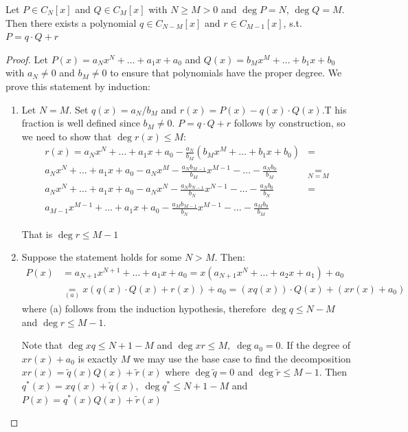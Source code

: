 \begin{lemma} \label{lm:long div}
    Let $P \in C_N[x]$ and $Q \in C_M[x]$ with $N \geq M > 0$ and $\deg P = N$, $\deg Q = M$. Then there exists a polynomial $q \in C_{N-M}[x]$ and $r \in C_{M-1}[x]$, s.t. $P = q\cdot Q + r$
\end{lemma}
\begin{proof}
    Let $P(x) = a_{N}x^N + \dots + a_1x + a_0$ and $Q(x) = b_{M}x^M + \dots + b_1x + b_0$ with $a_N \neq 0$ and $b_M \neq 0$ to ensure that polynomials have the proper degree.
    We prove this statement by induction:
    \begin{enumerate}
        \item[Base:] Let $N = M$. Set $q(x) = a_N / b_M$ and $r(x) = P(x) - q(x)\cdot Q(x)$.T his fraction is well defined since $b_M \neq 0$. $P = q\cdot Q + r$ follows by construction, so we need to show that $\deg r(x) \leq M$:
              \begin{align*}
                  r(x) = a_{N}x^N + \dots + a_1x + a_0 - \frac{a_N}{b_M} (b_{M}x^M + \dots + b_1x + b_0)
                   & =                 \\ a_{N}x^N + \dots + a_1x + a_0 - a_N x^M - \frac{a_N b_{M -1}}{b_M}x^{M-1} - \dots - \frac{a_N b_0}{b_M}
                   & \underset{N=M}{=} \\ a_{N}x^N + \dots + a_1x + a_0 - a_N x^N - \frac{a_N b_{N -1}}{b_N}x^{N-1} - \dots - \frac{a_N b_0}{b_N}
                   & =                 \\ a_{M-1}x^{M-1} + \dots + a_1x + a_0 - \frac{a_M b_{M -1}}{b_N}x^{M-1} - \dots - \frac{a_M b_0}{b_M}
              \end{align*}

              That is $\deg r \leq M-1$
        \item[Step:] Suppose the statement holds for some $N > M$. Then:
              \begin{align*}
                  P(x)
                   & = a_{N+1}x^{N+1} + \dots + a_1x + a_0
                  = x(a_{N+1}x^{N} + \dots + a_2x + a_1) + a_0
                  \\ &\underset{(a)}{=} x (q(x)\cdot Q(x) + r(x)) + a_0
                  = (xq(x)) \cdot Q(x) + (xr(x) + a_0)
              \end{align*}
              where (a) follows from the induction hypothesis, therefore $\deg q \leq N-M$ and $\deg r \leq M - 1$.

              Note that $\deg xq \leq N+1-M$ and $\deg xr \leq M,\; \deg a_0 = 0$. If the degree of $xr(x) + a_0$ is exactly $M$ we may use the base case to find the decomposition $xr(x) = \tilde{q}(x)Q(x) + \tilde{r}(x)$ where $\deg \tilde{q} = 0$ and $\deg \tilde{r} \leq M-1$. Then $q^*(x) = xq(x) + \tilde{q}(x),\; \deg q^* \leq N+1-M$ and $P(x) = q^*(x)Q(x) + \tilde{r}(x)$
    \end{enumerate}
\end{proof}

